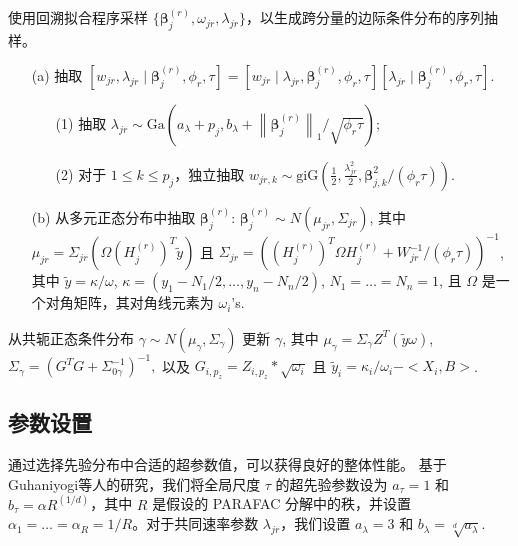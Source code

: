 \documentclass[AutoFakeBold]{LZUThesis}
\newcommand{\scite}[1]{\textsuperscript{\cite{#1}}}
\begin{document}
\begin{algorithm}
\begin{algorithmic}[1]
		\State 使用回溯拟合程序采样 $\{\boldsymbol{\beta}_j^{(r)}, \omega_{jr}, \lambda_{jr}\}$，以生成跨分量的边际条件分布的序列抽样。
		\begin{itemize}
			\item [(a)]抽取 $[w_{jr}, \lambda_{jr} \mid \boldsymbol{\beta}_j^{(r)}, \phi_r, \tau] = [w_{jr} \mid \lambda_{jr}, \boldsymbol{\beta}_j^{(r)}, \phi_r, \tau][\lambda_{jr} \mid \boldsymbol{\beta}_j^{(r)}, \phi_r, \tau]$.
			\begin{itemize}
				\item [(1)]抽取 $\lambda_{jr} \sim \text{Ga}\left(a_{\lambda} + p_j, b_{\lambda} + \left\|\boldsymbol{\beta}_j^{(r)}\right\|_1 / \sqrt{\phi_r \tau}\right)$;
				\item [(2)]对于 $1 \le k \le p_j$，独立抽取 $w_{jr,k} \sim \text{giG}\left(\frac{1}{2}, \frac{\lambda_{jr}^2}{2}, \boldsymbol{\beta}_{j,k}^2 / (\phi_r \tau)\right)$.
			\end{itemize}
			\item [(b)]从多元正态分布中抽取 $\boldsymbol{\beta}_j^{(r)}$: $\boldsymbol{\beta}_j^{(r)} \sim N(\mu_{jr}, \Sigma_{jr})$, 其中 $\mu_{jr} = \Sigma_{jr}(\Omega(H_j^{(r)})^T\tilde{y})$ 且 $\Sigma_{jr} = ((H_j^{(r)})^T\Omega H_j^{(r)} + W_{jr}^{-1}/(\phi_r\tau))^{-1}$, 其中 $\tilde{y} = \kappa/\omega$, $\kappa = (y_1 - N_1/2, \dots, y_n - N_n/2)$, $N_1 = \dots = N_n = 1$, 且 $\Omega$ 是一个对角矩阵，其对角线元素为 $\omega_i$'s.
		\end{itemize}
		
		\State 从共轭正态条件分布 $\gamma \sim N(\mu_\gamma, \Sigma_\gamma)$ 更新 $\gamma$, 其中
		$
		\mu_\gamma = \Sigma_\gamma Z^T(\tilde{y}\omega)$, $\Sigma_\gamma = (G^T G + \Sigma_{0\gamma}^{-1})^{-1},
		$
		以及 $G_{i,p_z} = Z_{i,p_z} * \sqrt{\omega_i}$ 且 $\tilde{y}_i = \kappa_i/\omega_i - <X_i, B>$.
		
	\end{algorithmic}
\end{algorithm}

\subsection{参数设置}
通过选择先验分布中合适的超参数值，可以获得良好的整体性能。
基于Guhaniyogi等人的研究\scite{guhaniyogi2017bayesian}，我们将全局尺度 $\tau$ 的超先验参数设为 $a_\tau = 1$ 和 $b_\tau = \alpha R^{(1/d)}$，其中 $R$ 是假设的 PARAFAC 分解中的秩，并设置 $\alpha_1 = \dots = \alpha_R = 1/R$。对于共同速率参数 $\lambda_{jr}$，我们设置 $a_\lambda = 3$ 和 $b_\lambda = \sqrt[d]{a_\lambda}$. 
\end{document}
